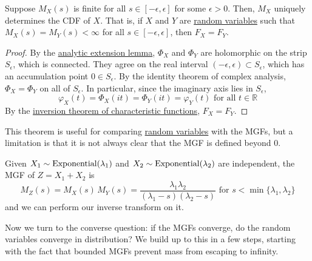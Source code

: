 	\begin{theorem}
	  \label{thm:inversion-theorem}
		Suppose $M_X (s)$ is finite for all $s \in [-\epsilon, \epsilon]$ for some $\epsilon > 0$. Then, $M_X$ uniquely determines the CDF of $X$. That is, if $X$ and $Y$ are \hyperref[def:random-variable]{random variables} such that $M_X (s) = M_Y (s) < \infty$ for all $s \in [-\epsilon, \epsilon]$, then $F_X = F_Y$. 
	\end{theorem}
	\begin{proof}
		By the \hyperref[thm:analytic-extension-of-the-mgf]{analytic extension lemma}, $\Phi_X$ and $\Phi_Y$ are holomorphic on the strip $S_\epsilon$, which is connected. They agree on the real interval $(-\epsilon, \epsilon) \subset S_\epsilon$, which has an accumulation point $0 \in S_\epsilon$. By the identity theorem of complex analysis, $\Phi_X = \Phi_Y$ on all of $S_\epsilon$. In particular, since the imaginary axis lies in $S_\epsilon$, 
		\begin{equation}
			\varphi_X (t) = \Phi_X (i t) = \Phi_Y (i t) = \varphi_Y (t) \text{ for all } t \in \mathbb{R}
		\end{equation}
		By the \hyperref[thm:inversion-theorem-cf]{inversion theorem of characteristic functions}, $F_X = F_Y$. 
	\end{proof}

	This theorem is useful for comparing \hyperref[def:random-variable]{random variables} with the MGFs, but a limitation is that it is not always clear that the MGF is defined beyond $0$. 

	\begin{example}
	  \label{ex:inverting-a-moment-generating-function}
		Given $X_1 \sim \operatorname{Exponential}(\lambda_1)$ and $X_2 \sim \operatorname{Exponential}(\lambda_2)$ are independent, the MGF of $Z = X_1 + X_2$ is 
		\begin{equation}
			M_Z (s) = M_X (s) \, M_Y (s) = \frac{\lambda_1 \lambda_2}{(\lambda_1 - s)(\lambda_2 - s)} \text{ for } s < \min\{\lambda_1, \lambda_2\}
		\end{equation}
		and we can perform our inverse transform on it. 
	\end{example}

	Now we turn to the converse question: if the MGFs converge, do the random variables converge in distribution? We build up to this in a few steps, starting with the fact that bounded MGFs prevent mass from escaping to infinity. 

